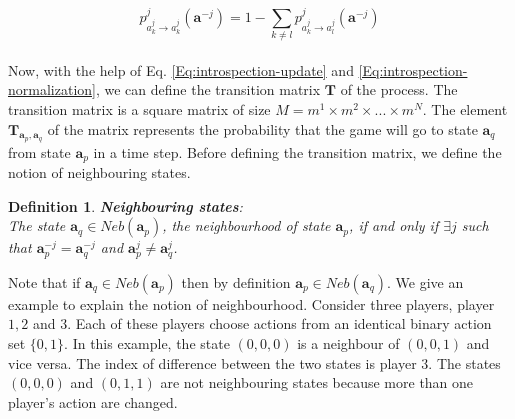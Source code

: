 \documentclass[11pt]{article}
\theoremstyle{plainCl1}
\newtheorem{definition}{Definition}
\theoremstyle{plainCl2}
\newcommand{\abf}{\mathbf{a}}
\newcommand{\T}{\mathbf{T}}
\begin{document}
\begin{equation}
 p^j_{a^j_k \to a^j_k} (\abf^{-j}) = 1 - \sum_{k \neq l} p^j_{a^j_k \to a^j_l} (\abf^{-j})
 \label{Eq:introspection-normalization}
\end{equation}
\\ 
\noindent Now, with the help of Eq. \ref{Eq:introspection-update} and \ref{Eq:introspection-normalization}, we can define the transition matrix $\T$ of the process. The transition matrix is a square matrix of size $M = m^1 \times m^2 \times ... \times m^N$. The element $\T_{\abf_p, \abf_q}$ of the matrix represents the probability that the game will go to state $\abf_q$ from state $\abf_p$ in a time step. Before defining the transition matrix, we define the notion of neighbouring states. 

\begin{definition}
\textbf{Neighbouring states}: \\ The state $\abf_q \in \mathit{Neb}(\abf_p)$, the neighbourhood of state $\abf_p$, if and only if $\exists j$ such that $\abf_p^{-j} = \abf_q^{-j}$ and $\abf_p^{j} \neq \abf_q^{j}$. 
\label{Def:neighbourhood-states}
\end{definition}
\noindent Note that if $\abf_q \in \mathit{Neb}(\abf_p)$ then by definition $\abf_p \in \mathit{Neb}(\abf_q)$. We give an example to explain the notion of neighbourhood. Consider three players, player $1,2$ and $3$. Each of these players choose actions from an identical binary action set $\{\mathit{0},\mathit{1}\}$. In this example, the state $(\mathit{0}, \mathit{0}, \mathit{0})$ is a neighbour of $(\mathit{0}, \mathit{0}, \mathit{1})$ and vice versa. The index of difference between the two states is player $3$. The states  $(\mathit{0}, \mathit{0}, \mathit{0})$ and $(\mathit{0}, \mathit{1}, \mathit{1})$ are not neighbouring states because more than one player's action are changed. 
\end{document}
